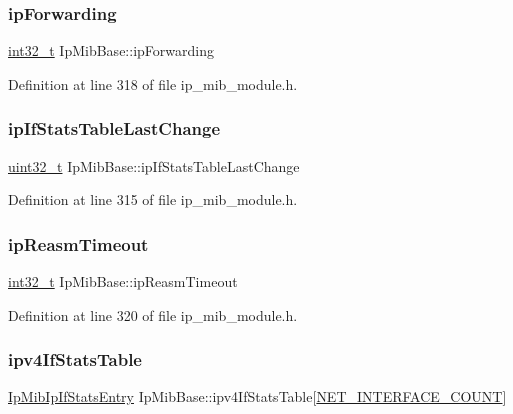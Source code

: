 \subsubsection{\texorpdfstring{ip\+Forwarding}{ipForwarding}}
{\footnotesize\ttfamily \hyperlink{stdint_8h_ab1967d8591af1a4e48c37fd2b0f184d0}{int32\+\_\+t} Ip\+Mib\+Base\+::ip\+Forwarding}



Definition at line 318 of file ip\+\_\+mib\+\_\+module.\+h.

\mbox{\label{structIpMibBase_a8cdd6b8806367452ed88c4ff7fddc8fe}} 
\subsubsection{\texorpdfstring{ip\+If\+Stats\+Table\+Last\+Change}{ipIfStatsTableLastChange}}
{\footnotesize\ttfamily \hyperlink{stdint_8h_a435d1572bf3f880d55459d9805097f62}{uint32\+\_\+t} Ip\+Mib\+Base\+::ip\+If\+Stats\+Table\+Last\+Change}



Definition at line 315 of file ip\+\_\+mib\+\_\+module.\+h.

\mbox{\label{structIpMibBase_a99ed70a6bde37e1735a2b000886ada16}} 
\subsubsection{\texorpdfstring{ip\+Reasm\+Timeout}{ipReasmTimeout}}
{\footnotesize\ttfamily \hyperlink{stdint_8h_ab1967d8591af1a4e48c37fd2b0f184d0}{int32\+\_\+t} Ip\+Mib\+Base\+::ip\+Reasm\+Timeout}



Definition at line 320 of file ip\+\_\+mib\+\_\+module.\+h.

\mbox{\label{structIpMibBase_ac645b5ee1034d3b3a91c8e8ce6321f3e}} 
\subsubsection{\texorpdfstring{ipv4\+If\+Stats\+Table}{ipv4IfStatsTable}}
{\footnotesize\ttfamily \hyperlink{structIpMibIpIfStatsEntry}{Ip\+Mib\+Ip\+If\+Stats\+Entry} Ip\+Mib\+Base\+::ipv4\+If\+Stats\+Table\mbox{[}\hyperlink{net__config_8h_a116f850ebcb023ffa3e6b8de10c5cb35}{N\+E\+T\+\_\+\+I\+N\+T\+E\+R\+F\+A\+C\+E\+\_\+\+C\+O\+U\+NT}\mbox{]}}




